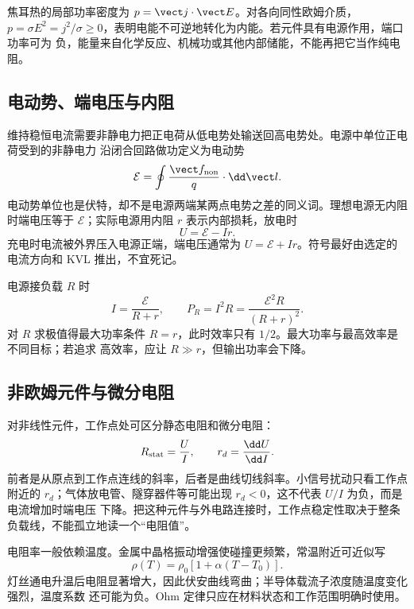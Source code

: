 焦耳热的局部功率密度为 $p=\vect j\cdot\vect E$。对各向同性欧姆介质，
$p=\sigma E^2=j^2/\sigma\ge0$，表明电能不可逆地转化为内能。若元件具有电源作用，端口功率可为
负，能量来自化学反应、机械功或其他内部储能，不能再把它当作纯电阻。

\subsection*{电动势、端电压与内阻}

维持稳恒电流需要非静电力把正电荷从低电势处输送回高电势处。电源中单位正电荷受到的非静电力
沿闭合回路做功定义为电动势
\begin{equation}
 \mathcal E=\oint\frac{\vect f_{\rm non}}q\cdot\dd\vect l.
\end{equation}
电动势单位也是伏特，却不是电源两端某两点电势之差的同义词。理想电源无内阻时端电压等于
$\mathcal E$；实际电源用内阻 $r$ 表示内部损耗，放电时
\begin{equation}
 U=\mathcal E-Ir.
\end{equation}
充电时电流被外界压入电源正端，端电压通常为 $U=\mathcal E+Ir$。符号最好由选定的电流方向和
KVL 推出，不宜死记。

电源接负载 $R$ 时
\begin{equation}
 I=\frac{\mathcal E}{R+r},
 \qquad
 P_R=I^2R=\frac{\mathcal E^2R}{(R+r)^2}.
\end{equation}
对 $R$ 求极值得最大功率条件 $R=r$，此时效率只有 $1/2$。最大功率与最高效率是不同目标；若追求
高效率，应让 $R\gg r$，但输出功率会下降。

\subsection*{非欧姆元件与微分电阻}

对非线性元件，工作点处可区分静态电阻和微分电阻：
\begin{equation}
 R_{\rm stat}=\frac UI,
 \qquad
 r_d=\frac{\dd U}{\dd I}.
\end{equation}
前者是从原点到工作点连线的斜率，后者是曲线切线斜率。小信号扰动只看工作点附近的
$r_d$；气体放电管、隧穿器件等可能出现 $r_d<0$，这不代表 $U/I$ 为负，而是电流增加时端电压
下降。把这种元件与外电路连接时，工作点稳定性取决于整条负载线，不能孤立地读一个“电阻值”。

电阻率一般依赖温度。金属中晶格振动增强使碰撞更频繁，常温附近可近似写
\begin{equation}
 \rho(T)=\rho_0[1+\alpha(T-T_0)].
\end{equation}
灯丝通电升温后电阻显著增大，因此伏安曲线弯曲；半导体载流子浓度随温度变化强烈，温度系数
还可能为负。Ohm 定律只应在材料状态和工作范围明确时使用。

